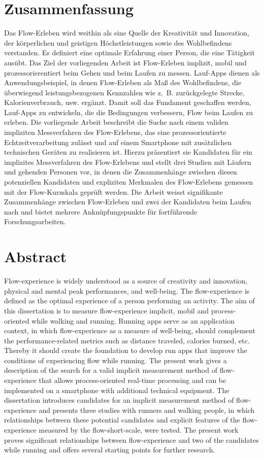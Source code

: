 

\section*{Zusammenfassung} Das Flow-Erleben wird weithin als eine Quelle der Kreativität und Innovation, der körperlichen und geistigen Höchstleistungen sowie des Wohlbefindens verstanden. Es definiert eine optimale Erfahrung einer Person, die eine Tätigkeit ausübt. Das Ziel der vorliegenden Arbeit ist Flow-Erleben implizit, mobil und prozessorierentiert beim Gehen und beim Laufen zu messen. Lauf-Apps dienen als Anwendungsbeispiel, in denen Flow-Erleben als Maß des Wohlbefindens, die überwiegend leistungsbezogenen Kennzahlen wie z.~B. zurückgelegte Strecke, Kalorienverbrauch, usw. ergänzt. Damit soll das Fundament geschaffen werden, Lauf-Apps zu entwickeln, die die Bedingungen verbessern, Flow beim Laufen zu erleben. Die vorliegende Arbeit beschreibt die Suche nach einem validen impliziten Messverfahren des Flow-Erlebens, das eine prozessorientierte Echtzeitverarbeitung zulässt und auf einem Smartphone mit zusätzlichen technischen Geräten zu realisieren ist. Hierzu präsentiert sie Kandidaten für ein implizites Messverfahren des Flow-Erlebens und stellt drei Studien mit Läufern und gehenden Personen vor, in denen die Zusammenhänge zwischen diesen potenziellen Kandidaten und expliziten Merkmalen des Flow-Erlebens gemessen mit der Flow-Kurzskala geprüft werden. Die Arbeit weisst signifikante Zusammenhänge zwischen Flow-Erleben und zwei der Kandidaten beim Laufen nach und bietet mehrere Anknüpfungspunkte für fortführende Forschungsarbeiten. 
\newpage

\section*{Abstract} Flow-experience is widely understood as a source of creativity and innovation, physical and mental peak performances, and well-being. The flow-experience is defined as the optimal experience of a person performing an activity. The aim of this dissertation is to measure flow-experience implicit, mobil and process-oriented while walking and running. Running apps serve as an application context, in which flow-experience as a measure of well-being, should complement the performance-related metrics such as distance traveled, calories burned, etc. Thereby it should create the foundation to develop run apps that improve the conditions of experiencing flow while running. The present work gives a description of the search for a valid implicit measurement method of flow-experience that allows process-oriented real-time processing and can be implemented on a smartphone with additional technical equipment. The dissertation introduces candidates for an implicit measurement method of flow-experience and presents three studies with runners and walking people, in which relationships between these potential candidates and explicit features of the flow-experience measured by the flow-short-scale, were tested. The present work proves significant relationships between flow-experience and two of the candidates while running and offers several starting points for further research. 
